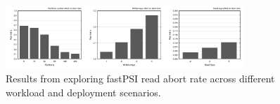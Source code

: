 \begin{figure}[t]
\begin{center}
\includegraphics[width=0.8\textwidth]{figures/psi_read_abort_bench.pdf}
\vspace{-0.5cm}
\end{center}
\caption{Results from exploring fastPSI read abort rate across different workload and deployment scenarios.}
\label{fig:fastpsi_abort_rate}
\end{figure}